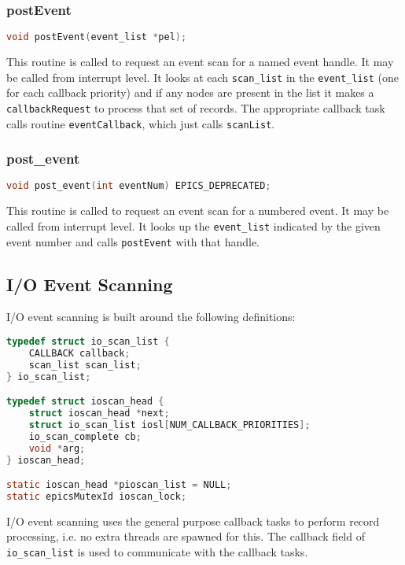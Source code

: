 \subsubsection{postEvent}

\begin{lstlisting}[language=C]
void postEvent(event_list *pel);
\end{lstlisting}

This routine is called to request an event scan for a named event handle.
It may be called from interrupt level.
It looks at each \verb|scan_list| in the \verb|event_list| (one for each callback priority) and if any nodes are present in the list it makes a \verb|callbackRequest| to process that set of records.
The appropriate callback task calls routine \verb|eventCallback|, which just calls \verb|scanList|.

\subsubsection{post\_event}

\begin{lstlisting}[language=C]
void post_event(int eventNum) EPICS_DEPRECATED;
\end{lstlisting}

This routine is called to request an event scan for a numbered event.
It may be called from interrupt level.
It looks up the \verb|event_list| indicated by the given event number and calls \verb|postEvent| with that handle.

\subsection{I/O Event Scanning}

I/O event scanning is built around the following definitions:

\begin{lstlisting}[language=C]
typedef struct io_scan_list {
    CALLBACK callback;
    scan_list scan_list;
} io_scan_list;

typedef struct ioscan_head {
    struct ioscan_head *next;
    struct io_scan_list iosl[NUM_CALLBACK_PRIORITIES];
    io_scan_complete cb;
    void *arg;
} ioscan_head;

static ioscan_head *pioscan_list = NULL;
static epicsMutexId ioscan_lock;
\end{lstlisting}

I/O event scanning uses the general purpose callback tasks to perform record processing, i.e. no extra threads are spawned for this.
The callback field of \verb|io_scan_list| is used to communicate with the callback tasks.

